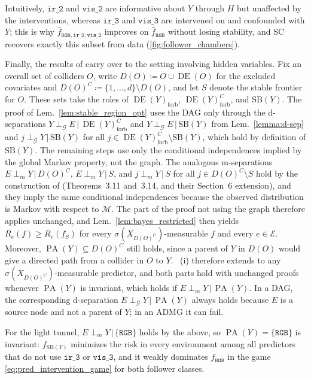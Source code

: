 \documentclass{article}
\newcommand{\Env}{\mathcal{E}}
\newcommand{\G}{\mathcal{G}}
\newcommand{\DEYforb}{\DE(Y)_\mathrm{forb}}
\newcommand{\SB}{\mathrm{SB}}
\DeclareMathOperator{\PA}{PA}
\DeclareMathOperator{\DE}{DE}
\newcommand{\given}{\,|\,}
\newcommand{\dsep}[1]{\mathrel{\perp_{#1}}}
\newcommand{\msep}{\mathrel{\perp_{m}}}
\begin{document}
Intuitively, $\mathtt{ir\_2}$ and $\mathtt{vis\_2}$ are informative about $Y$ through $H$ but unaffected by the interventions, whereas $\mathtt{ir\_3}$ and $\mathtt{vis\_3}$ are intervened on and confounded with $Y$; this is why $\hat{f}_{\mathtt{RGB}, \mathtt{ir\_2}, \mathtt{vis\_2}}$ improves on $\hat{f}_{\mathtt{RGB}}$ without losing stability, and SC recovers exactly this subset from data (\cref{fig:follower_chambers}).

Finally, the results of  carry over to the setting involving hidden variables.
Fix an overall set of colliders $O$, write $D(O) \coloneqq O \cup \DE(O)$ for the excluded covariates and $D(O)^C \coloneqq \{1, \ldots, d\} \setminus D(O)$, and let $S$ denote the stable frontier for $O$. These sets take the roles of $\DEYforb$, $\DEYforb^C$, and $\SB(Y)$.
The proof of Lem.~\ref{lem:stable_region_opt} uses the DAG only through the d-separations $Y \dsep{\G} E \given \DEYforb^C$ and $Y \dsep{\G} E \given \SB(Y)$ from Lem.~\ref{lemma:d-sep} and $j \dsep{\G} Y \given \SB(Y)$ for all $j \in \DEYforb^C \setminus \SB(Y)$, which hold by definition of $\SB(Y)$. The remaining steps use only the conditional independences implied by the global Markov property, not the graph.
The analogous m-separations $E \msep Y \given D(O)^C$, $E \msep Y \given S$, and $j \msep Y \given S$ for all $j \in D(O)^C \setminus S$ hold by the construction of \citet{xiangStableBlanketHidden2026} (Theorems~3.11 and~3.14, and their Section~6 extension), and they imply the same conditional independences because the observed distribution is Markov with respect to $\mathcal{M}$.
The part of the proof not using the graph therefore applies unchanged,
and Lem.~\ref{lem:bayes_restricted} then yields $R_e(f) \geq R_e(f_S)$ for every $\sigma(X_{D(O)^C})$-measurable $f$ and every $e \in \Env$.
Moreover, $\PA(Y) \subseteq D(O)^C$ still holds, since a parent of $Y$ in $D(O)$ would give a directed path from a collider in $O$ to $Y$.
~(i) therefore extends to any $\sigma(X_{D(O)^C})$-measurable predictor, and both parts hold with unchanged proofs whenever $\PA(Y)$ is invariant, which holds if $E \msep Y \given \PA(Y)$.
In a DAG, the corresponding d-separation $E \dsep{\G} Y \given \PA(Y)$ always holds because $E$ is a source node and not a parent of $Y$; in an ADMG it can fail.

For the light tunnel, $E \msep Y \given \{\mathtt{RGB}\}$ holds by the above, so $\PA(Y) = \{\mathtt{RGB}\}$ is invariant: $f_{\SB(Y)}$ minimizes the risk in every environment among all predictors that do not use $\mathtt{ir\_3}$ or $\mathtt{vis\_3}$, and it weakly dominates $f_{\mathtt{RGB}}$ in the game \eqref{eq:pred_intervention_game} for both follower classes.
\end{document}
